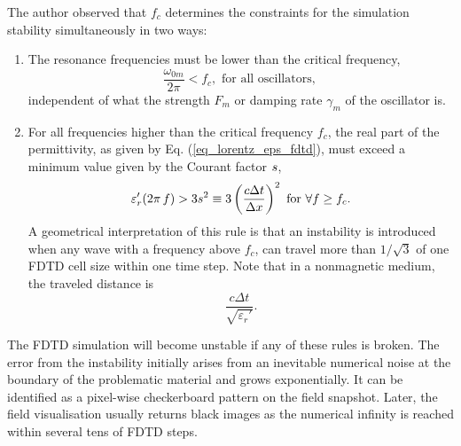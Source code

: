 The author observed that $f_c$ determines the constraints for the simulation stability simultaneously in two ways:
\begin{enumerate}
 \item{The resonance frequencies must be lower than the critical frequency,  %
\begin{equation} \frac{\omega_{0m}}{2\pi} < f_c, \text{ for all oscillators, } %
\end{equation}
independent of what the strength $F_m$ or damping rate $\gamma_m$ of the oscillator is. 
} 
 \item{For all frequencies higher than the critical frequency $f_c$, the real part of the permittivity, as given by Eq. (\ref{eq_lorentz_eps_fdtd}), must exceed a minimum value given by the Courant factor $s$,
\begin{equation} \varepsilon_r'(2\pi\,f) > 3 s^{2} \equiv 3 \left( \frac{c \Delta t}{\Delta x} \right)^{2} \text{ for } \forall f \geq f_c. \label{eq_fdtd_stability_realp}\end{equation}  } %
A geometrical interpretation of this rule is that an instability is introduced when any wave with a frequency above $f_c$, can travel more than $1/\sqrt{3}$ of one FDTD cell size within one time step. 
Note that in a nonmagnetic medium, the traveled distance is $$\frac{c\Delta t}{\sqrt{\varepsilon_r'}}.$$
\end{enumerate}
The FDTD simulation will become unstable if any of these rules is broken. The error from the instability initially arises from an inevitable numerical noise at the boundary of the problematic material and grows exponentially. It can be identified as a pixel-wise checkerboard pattern on the field snapshot. Later, the field visualisation usually returns black images as the numerical infinity is reached within several tens of FDTD steps. 

